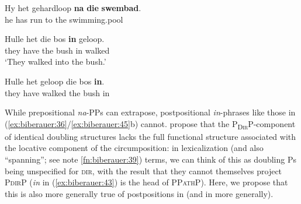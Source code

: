 \documentclass[output=paper]{LSP/langsci}
\begin{document}
 \ex
\gll Hy het gehardloop \textbf{na} \textbf{die} \textbf{swembad}.{\rmfnm}\\
    he  has run             to   the swimming.pool\\
\z
\z
{}

\ea%
    \label{ex:biberauer:45}
    \ea
    \gll   Hulle het     die bos    \textbf{in}    geloop.{}    \\
	    they  have   the bush  in    walked\\
    \glt  ‘They walked into the bush.’
  
 \ex 
\gll  *Hulle het    geloop  die bos   \textbf{in}.\\
      they   have walked the  bush in\\
\z
\z

While prepositional \textit{na}{}-PPs can extrapose, postpositional \textit{in}{}-phrases like those in (\ref{ex:biberauer:36}\slash \ref{ex:biberauer:45}b) cannot.   \citet{AelbrechtdenDikken2013} propose that the P\textsc{\textsubscript{Dir}}P-component of identical doubling structures lacks the full functional structure associated with the locative component of the circumposition: in lexicalization (and also “spanning”; see note \ref{fn:biberauer:39}) terms, we can think of this as doubling Ps being unspecified for \textsc{dir}, with the result that they cannot themselves project P\textsc{dir}P (\textit{in} in (\ref{ex:biberauer:43}) is the head of P\textsc{PathP}). Here, we propose that this is also more generally true of  postpositions in  (and in  more generally). 
\end{document}
